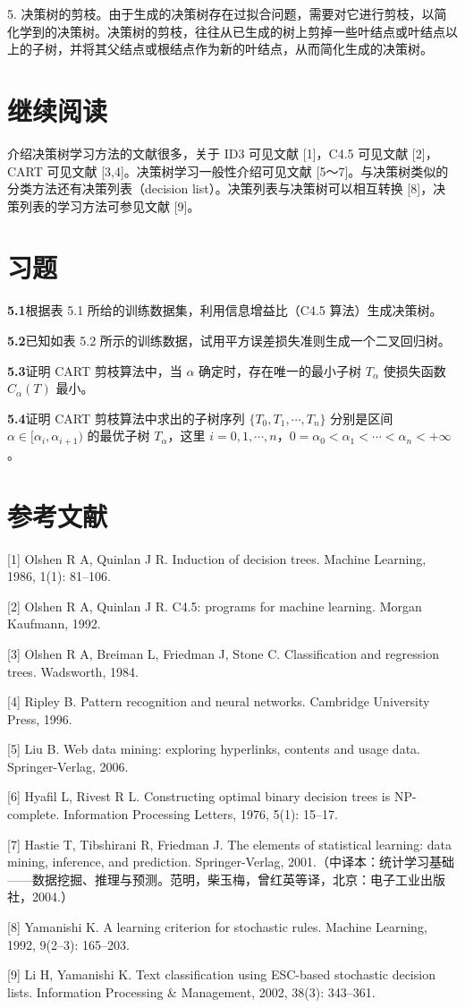 \documentclass[UTF8,12pt,a4paper,fontset=fandol]{ctexart}
\begin{document}
5. 决策树的剪枝。由于生成的决策树存在过拟合问题，需要对它进行剪枝，以简化学到的决策树。决策树的剪枝，往往从已生成的树上剪掉一些叶结点或叶结点以上的子树，并将其父结点或根结点作为新的叶结点，从而简化生成的决策树。

\section*{继续阅读}

介绍决策树学习方法的文献很多，关于 ID3 可见文献 [1]，C4.5 可见文献 [2]，CART 可见文献 [3,4]。决策树学习一般性介绍可见文献 [5～7]。与决策树类似的分类方法还有决策列表（decision list）。决策列表与决策树可以相互转换 [8]，决策列表的学习方法可参见文献 [9]。

\section*{习题}

\noindent\textbf{5.1}\quad 根据表 5.1 所给的训练数据集，利用信息增益比（C4.5 算法）生成决策树。

\noindent\textbf{5.2}\quad 已知如表 5.2 所示的训练数据，试用平方误差损失准则生成一个二叉回归树。

\noindent\textbf{5.3}\quad 证明 CART 剪枝算法中，当 $\alpha$ 确定时，存在唯一的最小子树 $T_\alpha$ 使损失函数 $C_\alpha(T)$ 最小。

\noindent\textbf{5.4}\quad 证明 CART 剪枝算法中求出的子树序列 $\{T_0,T_1,\cdots,T_n\}$ 分别是区间 $\alpha\in[\alpha_i,\alpha_{i+1})$ 的最优子树 $T_\alpha$，这里 $i=0,1,\cdots,n$，$0=\alpha_0<\alpha_1<\cdots<\alpha_n<+\infty$。

\section*{参考文献}

[1] Olshen R A, Quinlan J R. Induction of decision trees. Machine Learning, 1986, 1(1): 81--106.

[2] Olshen R A, Quinlan J R. C4.5: programs for machine learning. Morgan Kaufmann, 1992.

[3] Olshen R A, Breiman L, Friedman J, Stone C. Classification and regression trees. Wadsworth, 1984.

[4] Ripley B. Pattern recognition and neural networks. Cambridge University Press, 1996.

[5] Liu B. Web data mining: exploring hyperlinks, contents and usage data. Springer-Verlag, 2006.

[6] Hyafil L, Rivest R L. Constructing optimal binary decision trees is NP-complete. Information Processing Letters, 1976, 5(1): 15--17.

[7] Hastie T, Tibshirani R, Friedman J. The elements of statistical learning: data mining, inference, and prediction. Springer-Verlag, 2001.（中译本：统计学习基础——数据挖掘、推理与预测。范明，柴玉梅，曾红英等译，北京：电子工业出版社，2004.）

[8] Yamanishi K. A learning criterion for stochastic rules. Machine Learning, 1992, 9(2--3): 165--203.

[9] Li H, Yamanishi K. Text classification using ESC-based stochastic decision lists. Information Processing \& Management, 2002, 38(3): 343--361.
\end{document}
